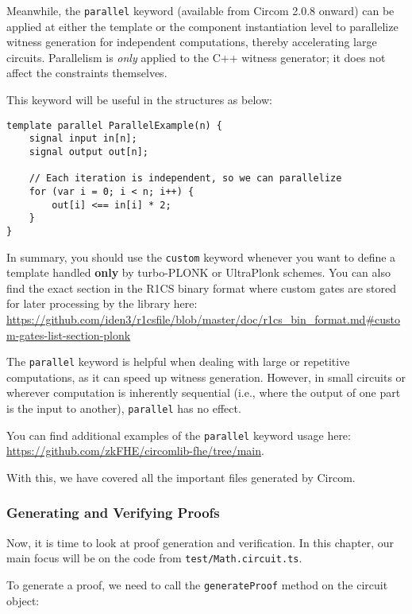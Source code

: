 \documentclass[../lecture-notes-105x135.tex]{subfiles}
\begin{document}
    Meanwhile, the \texttt{parallel} keyword (available from Circom 2.0.8 onward) can be applied at either the template or
    the component instantiation level to parallelize witness generation for independent computations, thereby accelerating large circuits.
    Parallelism is \emph{only} applied to the C++ witness generator; it does not affect the constraints themselves.

    This keyword will be useful in the structures as below:

    \begin{lstlisting}[language=Circom,basicstyle=\ttfamily\footnotesize]
template parallel ParallelExample(n) {
    signal input in[n];
    signal output out[n];

    // Each iteration is independent, so we can parallelize
    for (var i = 0; i < n; i++) {
        out[i] <== in[i] * 2;
    }
}
    \end{lstlisting}

    In summary, you should use the \texttt{custom} keyword whenever you want to define a template handled \textbf{only} by turbo-PLONK or UltraPlonk schemes.
    You can also find the exact section in the R1CS binary format where custom gates are stored for later processing by the library here:
    \url{https://github.com/iden3/r1csfile/blob/master/doc/r1cs_bin_format.md#custom-gates-list-section-plonk}

    The \texttt{parallel} keyword is helpful when dealing with large or repetitive computations, as it can speed up witness generation.
    However, in small circuits or wherever computation is inherently sequential (i.e., where the output of one part is the input to another), \texttt{parallel} has no effect.

    You can find additional examples of the \texttt{parallel} keyword usage here: \url{https://github.com/zkFHE/circomlib-fhe/tree/main}.

    With this, we have covered all the important files generated by Circom.

    \subsubsection{Generating and Verifying Proofs}

    Now, it is time to look at proof generation and verification.
    In this chapter, our main focus will be on the code from \texttt{test/Math.circuit.ts}.

    To generate a proof, we need to call the \texttt{generateProof} method on the circuit object:
\end{document}
